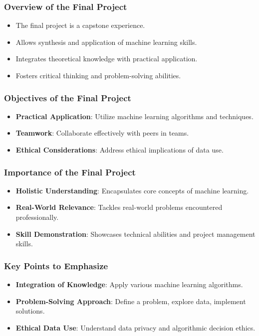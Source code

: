 \documentclass[aspectratio=169]{beamer}
\begin{document}
\frame{\titlepage}

\begin{frame}[fragile]
    \titlepage
\end{frame}

\begin{frame}[fragile]
    \frametitle{Overview of the Final Project}
    \begin{itemize}
        \item The final project is a capstone experience.
        \item Allows synthesis and application of machine learning skills.
        \item Integrates theoretical knowledge with practical application.
        \item Fosters critical thinking and problem-solving abilities.
    \end{itemize}
\end{frame}

\begin{frame}[fragile]
    \frametitle{Objectives of the Final Project}
    \begin{itemize}
        \item \textbf{Practical Application}: Utilize machine learning algorithms and techniques.
        \item \textbf{Teamwork}: Collaborate effectively with peers in teams.
        \item \textbf{Ethical Considerations}: Address ethical implications of data use.
    \end{itemize}
\end{frame}

\begin{frame}[fragile]
    \frametitle{Importance of the Final Project}
    \begin{itemize}
        \item \textbf{Holistic Understanding}: Encapsulates core concepts of machine learning.
        \item \textbf{Real-World Relevance}: Tackles real-world problems encountered professionally.
        \item \textbf{Skill Demonstration}: Showcases technical abilities and project management skills.
    \end{itemize}
\end{frame}

\begin{frame}[fragile]
    \frametitle{Key Points to Emphasize}
    \begin{itemize}
        \item \textbf{Integration of Knowledge}: Apply various machine learning algorithms.
        \item \textbf{Problem-Solving Approach}: Define a problem, explore data, implement solutions.
        \item \textbf{Ethical Data Use}: Understand data privacy and algorithmic decision ethics.
    \end{itemize}
\end{frame}
\end{document}

